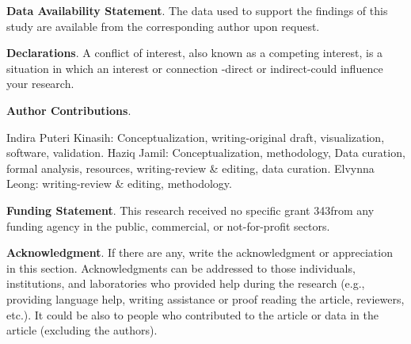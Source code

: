 \documentclass[a4paper,reqno]{amsart}
\begin{document}
\vspace{1.5cc}

\noindent \textbf{Data Availability Statement}. The data used to support the findings of this study are available from the corresponding author upon request.

\vspace{1.5cc}
\noindent \textbf{Declarations}. A conflict of interest, also known as a competing interest, is a situation in which an interest or connection -direct or indirect-could influence your research.   

\vspace{1.5cc}
\noindent \textbf{Author Contributions}. 
% 

Indira Puteri Kinasih: Conceptualization, writing-original draft, visualization, software, validation. Haziq Jamil: Conceptualization, methodology, Data curation, formal analysis, resources, writing-review \& editing, data curation. Elvynna Leong: writing-review \& editing, methodology. 

\vspace{1.5cc}
\noindent \textbf{Funding Statement}. This research received no specific grant   343from any funding agency in the public, commercial, or not-for-profit sectors.

\vspace{1.5cc}
\noindent \textbf{Acknowledgment}. If there are any, write the acknowledgment or appreciation in this section. Acknowledgments can be addressed to those individuals, institutions, and laboratories who provided help during the research (e.g., providing language help, writing assistance or proof reading the article, reviewers, etc.). It could be also to people who contributed to the article or data in the article (excluding the authors).


\vspace{2cc}



\end{document}
